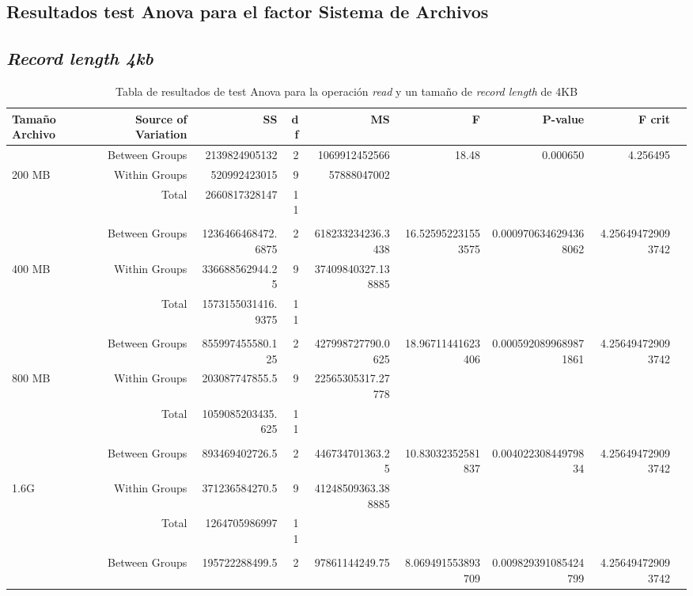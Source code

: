 \begin{landscape}


\section{Resultados test Anova para el factor Sistema de Archivos}\label{tablas_anova_sa_por_operacion}
\subsection{\textit{Record length 4kb}}

\begin{table}[!htp]\centering
\caption{Tabla de resultados de test Anova para la operación \textit{read} y un tamaño de \textit{record length} de 4KB}\label{tab: }
\scriptsize
\begin{tabular}{lrrrrrrrr}\toprule
Tamaño Archivo &Source of Variation &SS &df &MS &F &P-value &F crit \\\midrule
&Between Groups &2139824905132 &2 &1069912452566 &18.48 &0.000650 &4.256495 \\
200 MB &Within Groups &520992423015 &9 &57888047002 & & & \\
&Total &2660817328147 &11 & & & & \\
& & & & & & & \\
&Between Groups &1236466468472.6875 &2 &618233234236.3438 &16.525952231553575 &0.0009706346294368062 &4.256494729093742 \\
400 MB &Within Groups &336688562944.25 &9 &37409840327.138885 & & & \\
&Total &1573155031416.9375 &11 & & & & \\
& & & & & & & \\
&Between Groups &855997455580.125 &2 &427998727790.0625 &18.96711441623406 &0.0005920899689871861 &4.256494729093742 \\
800 MB &Within Groups &203087747855.5 &9 &22565305317.27778 & & & \\
&Total &1059085203435.625 &11 & & & & \\
& & & & & & & \\
&Between Groups &893469402726.5 &2 &446734701363.25 &10.83032352581837 &0.00402230844979834 &4.256494729093742 \\
1.6G &Within Groups &371236584270.5 &9 &41248509363.388885 & & & \\
&Total &1264705986997 &11 & & & & \\
& & & & & & & \\
&Between Groups &195722288499.5 &2 &97861144249.75 &8.069491553893709 &0.009829391085424799 &4.256494729093742 \\

\end{tabular}
\end{table}
\end{landscape}

